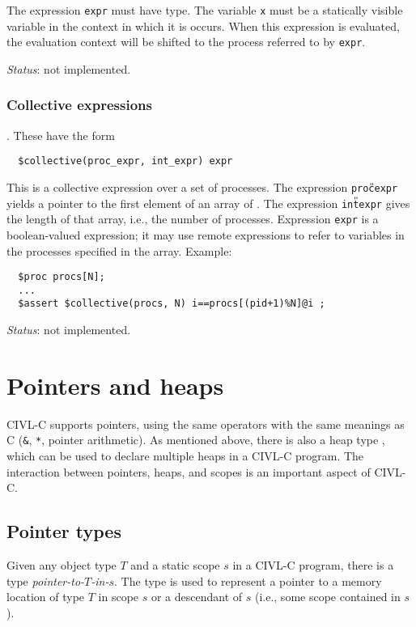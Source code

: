 The expression \verb!expr! must have \cproc{} type.  The variable
\texttt{x} must be a statically visible variable in the context in
which it is occurs.  When this expression is evaluated, the evaluation
context will be shifted to the process referred to by \texttt{expr}.

\emph{Status}: not implemented.

\subsection{Collective expressions}.  These have the form
\begin{verbatim}
  $collective(proc_expr, int_expr) expr 
\end{verbatim}
This is a collective expression over a set of processes.  The
expression \texttt{proc{\U}expr} yields a pointer to the first element
of an array of \cproc.  The expression \texttt{int{\U}expr} gives the
length of that array, i.e., the number of processes.  Expression
\texttt{expr} is a boolean-valued expression; it may use remote
expressions to refer to variables in the processes specified in the
array.  Example:
\begin{verbatim}
  $proc procs[N];
  ...
  $assert $collective(procs, N) i==procs[(pid+1)%N]@i ;
\end{verbatim}

\emph{Status}: not implemented.

\chapter{Pointers and heaps}

CIVL-C supports pointers, using the same operators with the same
meanings as C (\texttt{\&}, \texttt{*}, pointer arithmetic).
As mentioned above, there is also a heap type \cheap{}, which can
be used to declare multiple heaps in a CIVL-C program.  The
interaction between pointers, heaps, and scopes is an important
aspect of CIVL-C.

\section{Pointer types}

Given any object type $T$ and a static scope $s$ in a CIVL-C program,
there is a type \emph{pointer-to-$T$-in-$s$}.  The type is used to
represent a pointer to a memory location of type $T$ in scope $s$ or a
descendant of $s$ (i.e., some scope contained in $s$).

